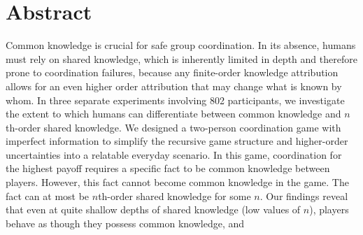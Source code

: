 \documentclass[10pt,letterpaper]{article}
\newcommand{\tobo}[1]{{\color{red} TOBO: #1}}
\newcommand{\tsn}[1]{{\color{blue} TSN: #1}}
\begin{document}
\section*{Abstract}
Common knowledge is crucial for safe group coordination. In its absence, %
humans must %
rely on shared knowledge, %
which is inherently limited in depth and therefore prone to coordination failures,
because any finite-order knowledge attribution allows for an even higher order attribution that may change what is known by whom. 
In three separate experiments involving 802 participants, we investigate the extent to which humans %
can differentiate between common knowledge and $n$th-order shared knowledge. We %
designed a two-person coordination game with imperfect information to simplify the %
recursive game structure and higher-order uncertainties into a relatable everyday scenario. 
In this game, coordination %
for the highest payoff requires a specific fact to be common knowledge between players. 
However, this fact cannot become common knowledge %
in the game. The fact can at most be $n$th-order shared knowledge for some $n$.
Our findings reveal that even at quite shallow depths of shared knowledge (low values of $n$), players behave as though they possess common knowledge, and %
\end{document}
